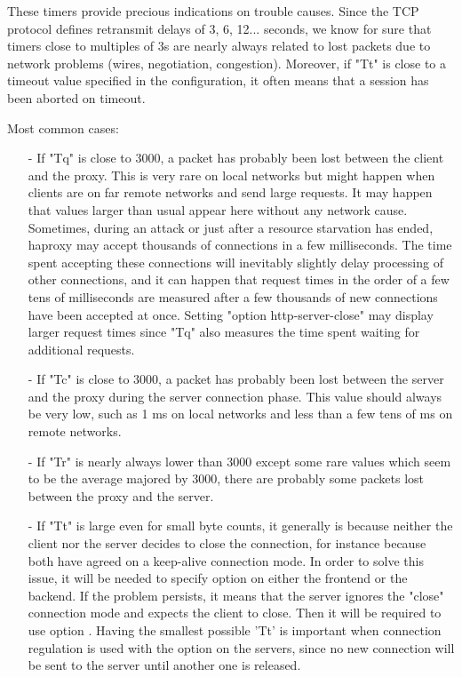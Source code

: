 These timers provide precious indications on trouble causes. Since the TCP
protocol defines retransmit delays of 3, 6, 12... seconds, we know for sure
that timers close to multiples of 3s are nearly always related to lost packets
due to network problems (wires, negotiation, congestion). Moreover, if "Tt" is
close to a timeout value specified in the configuration, it often means that a
session has been aborted on timeout.

Most common cases:

\begin{itemize}
\item[-]
    If "Tq" is close to 3000, a packet has probably been lost between the
    client and the proxy. This is very rare on local networks but might happen
    when clients are on far remote networks and send large requests. It may
    happen that values larger than usual appear here without any network cause.
    Sometimes, during an attack or just after a resource starvation has ended,
    haproxy may accept thousands of connections in a few milliseconds. The time
    spent accepting these connections will inevitably slightly delay processing
    of other connections, and it can happen that request times in the order of
    a few tens of milliseconds are measured after a few thousands of new
    connections have been accepted at once. Setting "option http-server-close"
    may display larger request times since "Tq" also measures the time spent
    waiting for additional requests.
\item[-]
    If "Tc" is close to 3000, a packet has probably been lost between the
    server and the proxy during the server connection phase. This value should
    always be very low, such as 1 ms on local networks and less than a few tens
    of ms on remote networks.
\item[-]
    If "Tr" is nearly always lower than 3000 except some rare values which seem
    to be the average majored by 3000, there are probably some packets lost
    between the proxy and the server.
\item[-]
    If "Tt" is large even for small byte counts, it generally is because
    neither the client nor the server decides to close the connection, for
    instance because both have agreed on a keep-alive connection mode. In order
    to solve this issue, it will be needed to specify option  on
    either the frontend or the backend. If the problem persists, it means that
    the server ignores the "close" connection mode and expects the client to
    close. Then it will be required to use option . Having the
    smallest possible 'Tt' is important when connection regulation is used with
    the  option on the servers, since no new connection will be sent
    to the server until another one is released.
\end{itemize}


